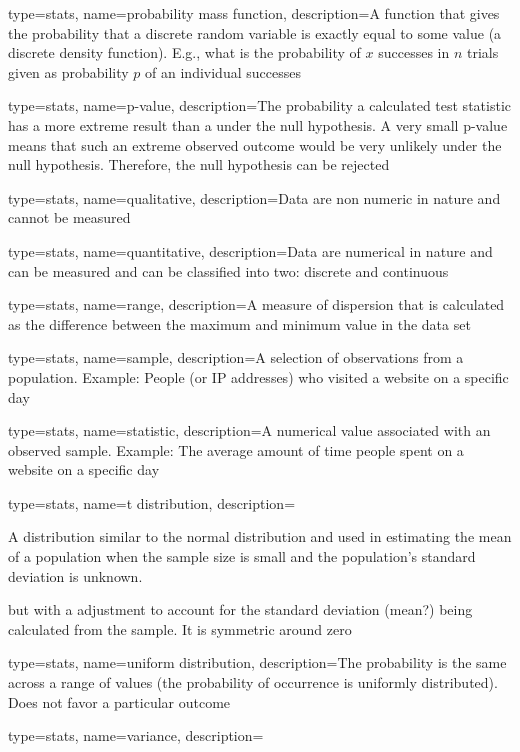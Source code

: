 {
	type=stats,
    name=probability mass function,
    description={A function that gives the probability that a discrete random variable is exactly equal to some value (a discrete density function).  E.g., what is the probability of $x$ successes in $n$ trials given as probability $p$ of an individual successes}
}

{
	type=stats,
    name=p-value,
    description={The probability a calculated test statistic has a more extreme result than a under the null hypothesis.   A very small p-value means that such an extreme observed outcome would be very unlikely under the null hypothesis.  Therefore, the null hypothesis can be rejected}
}

{
	type=stats,
    name=qualitative,
    description={Data are non numeric in nature and cannot be measured}
}

{
	type=stats,
    name=quantitative,
    description={Data are numerical in nature and can be measured and can be classified into two: discrete and continuous}
}

{
	type=stats,
    name=range,
    description={A measure of dispersion that is calculated as the difference between the maximum and minimum value in the data set}
}

{
	type=stats,
    name=sample,
    description={A selection of observations from a population. Example: People (or IP addresses) who visited a website on a specific day}
}

{
	type=stats,
    name=statistic,
    description={A numerical value associated with an observed sample. Example: The average amount of time people spent on a website on a specific day}
}

{
	type=stats,
    name=t distribution,
    description={A distribution similar to the normal distribution and used in estimating the mean of a population when the sample size is small and the population's standard deviation is unknown.  
    
    but with a adjustment to account for the standard deviation (mean?) being calculated from the sample.  It is symmetric around zero}
}

{
	type=stats,
    name=uniform distribution,
    description={The probability is the same across a range of values (the probability of occurrence is uniformly distributed).  Does not favor a particular outcome}
}

{
	type=stats,
    name=variance,
    description={}
} 